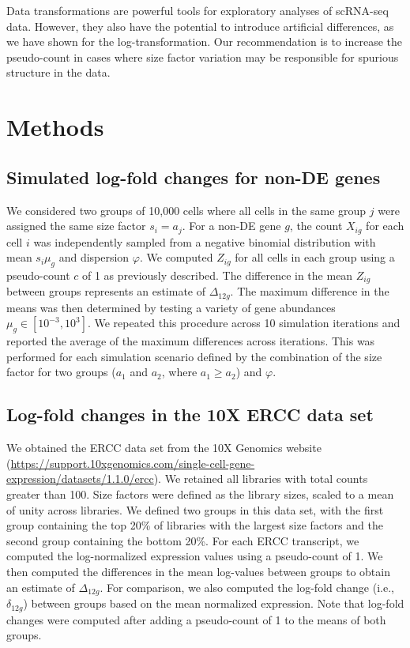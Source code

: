 \documentclass[10pt,letterpaper]{article}
\begin{document}
Data transformations are powerful tools for exploratory analyses of scRNA-seq data.
However, they also have the potential to introduce artificial differences, as we have shown for the log-transformation.
Our recommendation is to increase the pseudo-count in cases where size factor variation may be responsible for spurious structure in the data.

\section{Methods}

\subsection{Simulated log-fold changes for non-DE genes}
We considered two groups of 10,000 cells where all cells in the same group $j$ were assigned the same size factor $s_i=a_j$.
For a non-DE gene $g$, the count $X_{ig}$ for each cell $i$ was independently sampled from a negative binomial distribution with mean $s_i\mu_g$ and dispersion $\varphi$.
We computed $Z_{ig}$ for all cells in each group using a pseudo-count $c$ of 1 as previously described.
The difference in the mean $Z_{ig}$ between groups represents an estimate of $\Delta_{12g}$.
The maximum difference in the means was then determined by testing a variety of gene abundances $\mu_g \in [10^{-3}, 10^3]$.
We repeated this procedure across 10 simulation iterations and reported the average of the maximum differences across iterations.
This was performed for each simulation scenario defined by the combination of the size factor for two groups ($a_1$ and $a_2$, where $a_1 \ge a_2$) and $\varphi$.

\subsection{Log-fold changes in the 10X ERCC data set}
We obtained the ERCC data set from the 10X Genomics website (\url{https://support.10xgenomics.com/single-cell-gene-expression/datasets/1.1.0/ercc}).
We retained all libraries with total counts greater than 100.
Size factors were defined as the library sizes, scaled to a mean of unity across libraries.
We defined two groups in this data set, with the first group containing the top 20\% of libraries with the largest size factors and the second group containing the bottom 20\%.
For each ERCC transcript, we computed the log-normalized expression values using a pseudo-count of 1.
We then computed the differences in the mean log-values between groups to obtain an estimate of $\Delta_{12g}$.
For comparison, we also computed the log-fold change (i.e., $\delta_{12g}$) between groups based on the mean normalized expression.
Note that log-fold changes were computed after adding a pseudo-count of 1 to the means of both groups.
\end{document}
